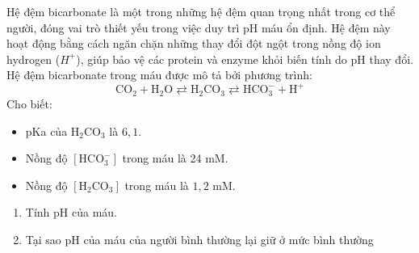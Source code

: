 \documentclass[Main.tex]{subfiles}
\begin{document}
\begin{bt}
	Hệ đệm bicarbonate là một trong những hệ đệm quan trọng nhất trong cơ thể người, đóng vai trò thiết yếu trong việc duy trì pH máu ổn định. Hệ đệm này hoạt động bằng cách ngăn chặn những thay đổi đột ngột trong nồng độ ion hydrogen ($H^+$), giúp bảo vệ các protein và enzyme khỏi biến tính do pH thay đổi.
	\\
	Hệ đệm bicarbonate trong máu được mô tả bởi phương trình:
	\[\mathrm{CO}_2+\mathrm{H}_2 \mathrm{O} \rightleftarrows \mathrm{H}_2 \mathrm{CO}_3 \rightleftarrows \mathrm{HCO}_3^{-}+\mathrm{H}^{+}\]
	Cho biết:
	\begin{itemize}
		\item pKa của $\mathrm{H}_2 \mathrm{CO}_3$ là $6{,}1$.
		\item Nồng độ $\left[\mathrm{HCO}_3^{-}\right]$ trong máu là 24 mM.
		\item Nồng độ $\left[\mathrm{H}_2 \mathrm{CO}_3\right]$ trong máu là $1{,}2$ mM.
	\end{itemize}
	\begin{enumerate}
		\item Tính pH của máu.
		\item Tại sao pH của máu của người bình thường lại giữ ở mức bình thường 
	\end{enumerate}
\end{bt}
\end{document}
